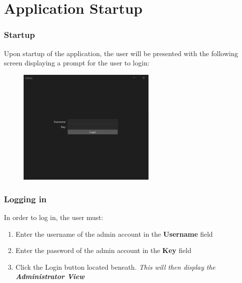 \section{Application Startup}
\subsubsection{Startup}
Upon startup of the application, the user will be presented with the following screen displaying a prompt for the user to login:
\begin{figure}[h]
    \centering
    \includegraphics[width=0.6\textwidth]{ApplicationStartup/login.PNG}
\end{figure}

\subsubsection{Logging in}
In order to log in, the user must:
\begin{enumerate}
    \item Enter the username of the admin account in the \textbf{Username} field
    \item Enter the password of the admin account in the \textbf{Key} field
    \item Click the Login button located beneath. \textit{This will then display the \textbf{Administrator View}}
\end{enumerate}